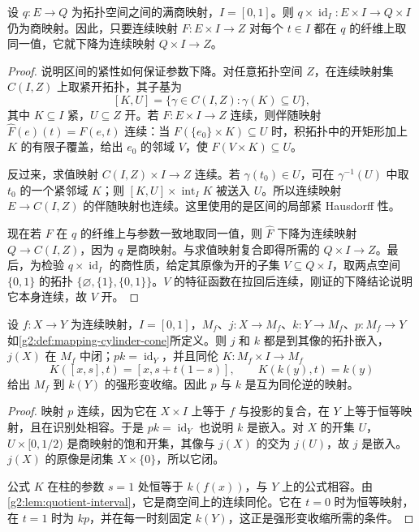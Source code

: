 \begin{lemma}\label{g2:lem:quotient-interval}
	设 \(q:E\to Q\) 为拓扑空间之间的满商映射，\(I=[0,1]\)。则 \(q\times\operatorname{id}_I:E\times I\to Q\times I\) 仍为商映射。因此，只要连续映射 \(F:E\times I\to Z\) 对每个 \(t\in I\) 都在 \(q\) 的纤维上取同一值，它就下降为连续映射 \(Q\times I\to Z\)。
\end{lemma}
\begin{proof}
	说明区间的紧性如何保证参数下降。对任意拓扑空间 \(Z\)，在连续映射集 \(C(I,Z)\) 上取紧开拓扑，其子基为
	\[
		[K,U]=\{\gamma\in C(I,Z):\gamma(K)\subseteq U\},
	\]
	其中 \(K\subseteq I\) 紧，\(U\subseteq Z\) 开。若 \(F:E\times I\to Z\) 连续，则伴随映射 \(\widehat F(e)(t)=F(e,t)\) 连续：当 \(F(\{e_0\}\times K)\subseteq U\) 时，积拓扑中的开矩形加上 \(K\) 的有限子覆盖，给出 \(e_0\) 的邻域 \(V\)，使 \(F(V\times K)\subseteq U\)。

	反过来，求值映射 \(C(I,Z)\times I\to Z\) 连续。若 \(\gamma(t_0)\in U\)，可在 \(\gamma^{-1}(U)\) 中取 \(t_0\) 的一个紧邻域 \(K\)；则 \([K,U]\times\operatorname{int}_I K\) 被送入 \(U\)。所以连续映射 \(E\to C(I,Z)\) 的伴随映射也连续。这里使用的是区间的局部紧 Hausdorff 性。

	现在若 \(F\) 在 \(q\) 的纤维上与参数一致地取同一值，则 \(\widehat F\) 下降为连续映射 \(Q\to C(I,Z)\)，因为 \(q\) 是商映射。与求值映射复合即得所需的 \(Q\times I\to Z\)。最后，为检验 \(q\times\operatorname{id}_I\) 的商性质，给定其原像为开的子集 \(V\subseteq Q\times I\)，取两点空间 \(\{0,1\}\) 的拓扑 \(\{\varnothing,\{1\},\{0,1\}\}\)。\(V\) 的特征函数在拉回后连续，刚证的下降结论说明它本身连续，故 \(V\) 开。
\end{proof}

\begin{proposition}\label{g2:prop:mapping-cylinder-retract}
	设 \(f:X\to Y\) 为连续映射，\(I=[0,1]\)，\(M_f\)、\(j:X\to M_f\)、\(k:Y\to M_f\)、\(p:M_f\to Y\) 如\cref{g2:def:mapping-cylinder-cone}所定义。则 \(j\) 和 \(k\) 都是到其像的拓扑嵌入，\(j(X)\) 在 \(M_f\) 中闭；\(pk=\operatorname{id}_Y\)，并且同伦 \(K:M_f\times I\to M_f\)
	\[
		K([x,s],t)=[x,s+t(1-s)],\qquad K(k(y),t)=k(y)
	\]
	给出 \(M_f\) 到 \(k(Y)\) 的强形变收缩。因此 \(p\) 与 \(k\) 是互为同伦逆的映射。
\end{proposition}
\begin{proof}
	映射 \(p\) 连续，因为它在 \(X\times I\) 上等于 \(f\) 与投影的复合，在 \(Y\) 上等于恒等映射，且在识别处相容。于是 \(pk=\operatorname{id}_Y\) 也说明 \(k\) 是嵌入。对 \(X\) 的开集 \(U\)，\(U\times[0,1/2)\) 是商映射的饱和开集，其像与 \(j(X)\) 的交为 \(j(U)\)，故 \(j\) 是嵌入。\(j(X)\) 的原像是闭集 \(X\times\{0\}\)，所以它闭。

	公式 \(K\) 在柱的参数 \(s=1\) 处恒等于 \(k(f(x))\)，与 \(Y\) 上的公式相容。由\cref{g2:lem:quotient-interval}，它是商空间上的连续同伦。它在 \(t=0\) 时为恒等映射，在 \(t=1\) 时为 \(kp\)，并在每一时刻固定 \(k(Y)\)，这正是强形变收缩所需的条件。
\end{proof}

